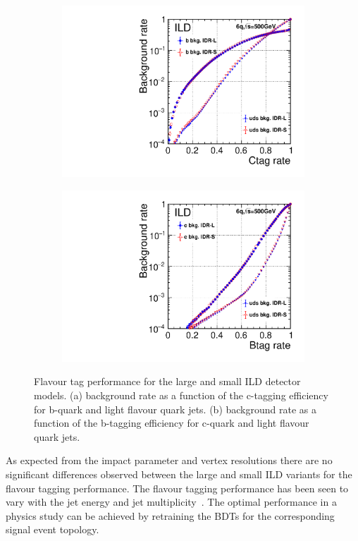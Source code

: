 \begin{figure}[htbp]
\begin{subfigure}{0.49\hsize}
\includegraphics[width=\textwidth]{Performance/fig/ctag_performance.pdf}
 \caption{ \label{fig:HLR-ctag_perf}}
 \end{subfigure}
\begin{subfigure}{0.49\hsize}
\includegraphics[width=\textwidth]{Performance/fig/btag_performance.pdf}
 \caption{  \label{fig:HLR-btag_perf}}
 \end{subfigure}
\caption{Flavour tag performance for the large and small ILD detector models. (a) background rate as a function of the c-tagging efficiency
  for b-quark and light flavour quark jets. (b) background rate as a function of the b-tagging efficiency for c-quark and light flavour quark jets. }
\label{fig:HLR-flavtag}
\end{figure}
%
As expected from the impact parameter and vertex resolutions there are no significant differences observed between the large and small ILD variants
for the flavour tagging performance.
The flavour tagging performance has been seen to vary with the jet energy and jet multiplicity~\cite{Suehara:2015ura}.
The optimal performance in a physics study can be achieved by retraining the BDTs for the corresponding signal event topology.

